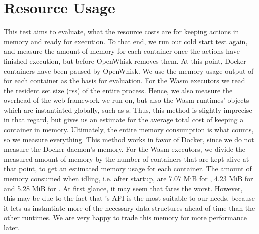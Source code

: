


\section{Resource Usage}

This test aims to evaluate, what the resource costs are for keeping actions in memory and ready for execution.
To that end, we run our cold start test again, and measure the amount of memory for each container once the actions have finished execution, but before OpenWhisk removes them. At this point, Docker containers have been paused by OpenWhisk. We use the memory usage output of  for each container as the basis for evaluation. For the Wasm executors we read the resident set size (rss) of the entire process. Hence, we also measure the overhead of the web framework we run on, but also the Wasm runtimes' objects which are instantiated globally, such as s. Thus, this method is slightly imprecise in that regard, but gives us an estimate for the average total cost of keeping a container in memory. Ultimately, the entire memory consumption is what counts, so we measure everything. This method works in favor of Docker, since we do not measure the Docker daemon's memory.
For the Wasm executors, we divide the measured amount of memory by the number of containers that are kept alive at that point, to get an estimated memory usage for each container. The amount of memory consumed when idling, i.e. after startup, are 7.07 MiB for , 4.23 MiB for  and 5.28 MiB for . At first glance, it may seem that  fares the worst. However, this may be due to the fact that 's API is the most suitable to our needs, because it lets us instantiate more of the necessary data structures ahead of time than the other runtimes. We are very happy to trade this memory for more performance later.

